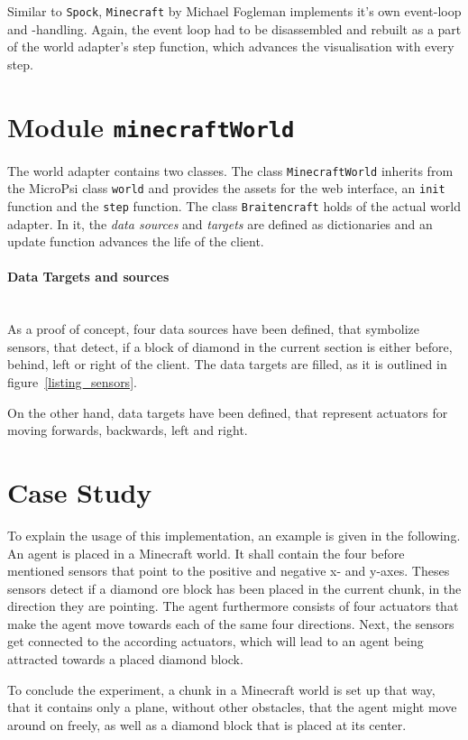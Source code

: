 Similar to \texttt{Spock}, \texttt{Minecraft} by Michael Fogleman implements it's own event-loop and -handling. Again, the event loop had to be disassembled and rebuilt as a part of the world adapter's step function, which advances the visualisation with every step.

    \section{Module \texttt{minecraftWorld}}
The world adapter contains two classes. The class \texttt{MinecraftWorld} inherits from the MicroPsi class \texttt{world} and provides the assets for the web interface, an \texttt{init} function and the \texttt{step} function. The class \texttt{Braitencraft} holds of the actual world adapter. In it, the \emph{data sources} and \emph{targets} are defined as dictionaries and an update function advances the life of the client.
    
\paragraph{Data Targets and sources}$\;$ \\

As a proof of concept, four data sources have been defined, that symbolize sensors, that detect, if a block of diamond in the current section is either before, behind, left or right of the client. The data targets are filled, as it is outlined in figure~\ref{listing_sensors}.

On the other hand, data targets have been defined, that represent actuators for moving forwards, backwards, left and right.

    \section{Case Study}
To explain the usage of this implementation, an example is given in the following. An agent is placed in a Minecraft world. It shall contain the four before mentioned sensors that point to the positive and negative x- and y-axes. Theses sensors detect if a diamond ore block has been placed in the current chunk, in the direction they are pointing. The agent furthermore consists of four actuators that make the agent move towards each of the same four directions. Next, the sensors get connected to the according actuators, which will lead to an agent being attracted towards a placed diamond block.

To conclude the experiment, a chunk in a Minecraft world is set up that way, that it contains only a plane, without other obstacles, that the agent might move around on freely, as well as a diamond block that is placed at its center. 

